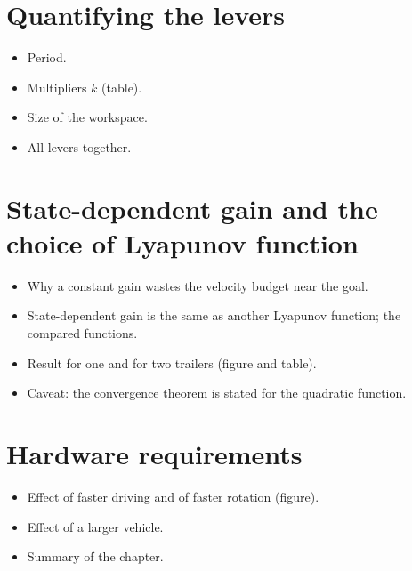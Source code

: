 \section{Quantifying the levers}
\label{sec:feas-levers}

\begin{itemize}
  \item Period.
  \item Multipliers $k$ (table).
  \item Size of the workspace.
  \item All levers together.
\end{itemize}

\section{State-dependent gain and the choice of Lyapunov function}
\label{sec:feas-V}

\begin{itemize}
  \item Why a constant gain wastes the velocity budget near the goal.
  \item State-dependent gain is the same as another Lyapunov function; the compared functions.
  \item Result for one and for two trailers (figure and table).
  \item Caveat: the convergence theorem is stated for the quadratic function.
\end{itemize}

\section{Hardware requirements}
\label{sec:feas-hw}

\begin{itemize}
  \item Effect of faster driving and of faster rotation (figure).
  \item Effect of a larger vehicle.
  \item Summary of the chapter.
\end{itemize}
